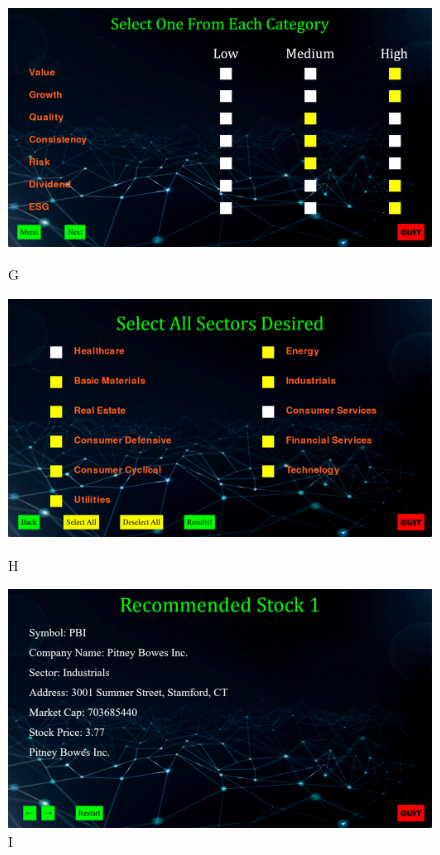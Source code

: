 \documentclass[fontsize=12pt]{article}
\begin{document}
\begin{figure}[!htb]
  \includegraphics[width=\linewidth]{img/g.png}
  \caption{G}\label{fig:awesome_image1}
\endminipage\hfill
{}
  \includegraphics[width=\linewidth]{img/h.png}
  \caption{H}\label{fig:awesome_image2}
\endminipage\hfill
{}
  \includegraphics[width=\linewidth]{img/i.png}
  \caption{I}\label{fig:awesome_image1}
\endminipage\hfill

\end{figure}
\end{document}

